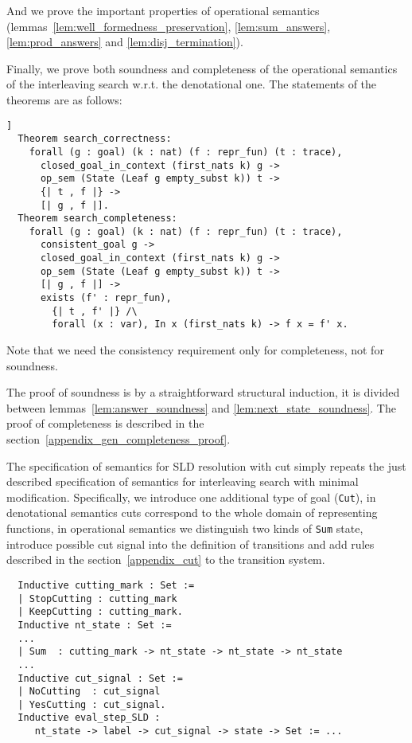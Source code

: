 And we prove the important properties of operational semantics (lemmas~\ref{lem:well_formedness_preservation}, \ref{lem:sum_answers}, \ref{lem:prod_answers} and \ref{lem:disj_termination}).

Finally, we prove both soundness and completeness of the operational semantics of the interleaving search w.r.t. the denotational one.
The statements of the theorems are as follows:

\newpage \begin{lstlisting}[language=Coq]]
  Theorem search_correctness:
    forall (g : goal) (k : nat) (f : repr_fun) (t : trace),
      closed_goal_in_context (first_nats k) g ->
      op_sem (State (Leaf g empty_subst k)) t ->
      {| t , f |} ->
      [| g , f |].
  Theorem search_completeness:
    forall (g : goal) (k : nat) (f : repr_fun) (t : trace),
      consistent_goal g ->
      closed_goal_in_context (first_nats k) g ->
      op_sem (State (Leaf g empty_subst k)) t ->
      [| g , f |] ->
      exists (f' : repr_fun),
        {| t , f' |} /\
        forall (x : var), In x (first_nats k) -> f x = f' x.
\end{lstlisting}

Note that we need the consistency requirement only for completeness, not for soundness.

The proof of soundness is by a straightforward structural induction, it is divided between lemmas~\ref{lem:answer_soundness} and \ref{lem:next_state_soundness}. The proof of completeness is described in the section~\ref{appendix_gen_completeness_proof}.

The specification of semantics for SLD resolution with cut simply repeats the just described specification of semantics for interleaving search with minimal modification. Specifically, we introduce one additional type of goal (\lstinline|Cut|), in denotational semantics cuts correspond to the whole domain of representing functions, in operational semantics we distinguish two kinds of \lstinline|Sum| state, introduce possible cut signal into the definition of transitions and add rules described in the section~\ref{appendix_cut} to the transition system. 

\begin{lstlisting}
  Inductive cutting_mark : Set :=
  | StopCutting : cutting_mark
  | KeepCutting : cutting_mark.
  Inductive nt_state : Set :=
  ...
  | Sum  : cutting_mark -> nt_state -> nt_state -> nt_state
  ...
  Inductive cut_signal : Set :=
  | NoCutting  : cut_signal
  | YesCutting : cut_signal.
  Inductive eval_step_SLD :
     nt_state -> label -> cut_signal -> state -> Set := ...
\end{lstlisting}

